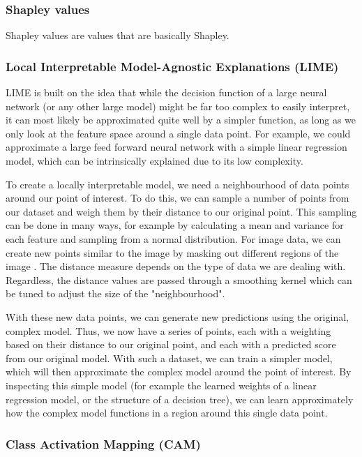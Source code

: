 \documentclass[UKenglish]{uiomasterthesis} %
\theoremstyle{definition}
\begin{document}
\subsubsection{Shapley values}

Shapley values are values that are basically Shapley.



\subsubsection{Local Interpretable Model-Agnostic Explanations (LIME)}

LIME \cite{lime} is built on the idea that while the decision function of a large neural network (or any other large model) might be far too complex to easily interpret, it can most likely be approximated quite well by a simpler function, as long as we only look at the feature space around a single data point. For example, we could approximate a large feed forward neural network with a simple linear regression model, which can be intrinsically explained due to its low complexity.

To create a locally interpretable model, we need a neighbourhood of data points around our point of interest. To do this, we can sample a number of points from our dataset and weigh them by their distance to our original point. This sampling can be done in many ways, for example by calculating a mean and variance for each feature and sampling from a normal distribution. For image data, we can create new points similar to the image by masking out different regions of the image \cite{molnar}. The distance measure depends on the type of data we are dealing with. Regardless, the distance values are passed through a smoothing kernel which can be tuned to adjust the size of the "neighbourhood".

With these new data points, we can generate new predictions using the original, complex model. Thus, we now have a series of points, each with a weighting based on their distance to our original point, and each with a predicted score from our original model. With such a dataset, we can train a simpler model, which will then approximate the complex model around the point of interest. By inspecting this simple model (for example the learned weights of a linear regression model, or the structure of a decision tree), we can learn approximately how the complex model functions in a region around this single data point.

\subsubsection{Class Activation Mapping (CAM)}
\end{document}
